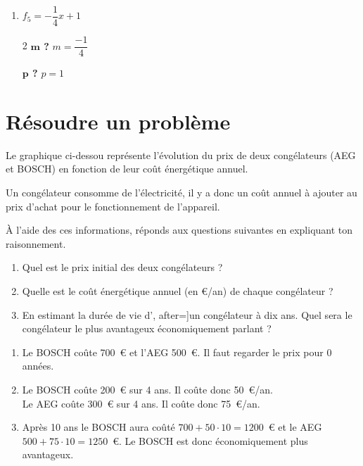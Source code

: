 \documentclass[a4paper, 12pt, parskip=half-]{scrartcl}
\begin{document}
\begin{solution}
\begin{enumerate}
\begin{multicols}{2}
                  \textbf{$\bm{p}$ ?}
                  \medbreak
                  $f_4$ est linéaire $\Rightarrow p=0$
              \end{multicols}
        \item $f_5 = -\dfrac{1}{4}x + 1 $
              \begin{multicols}{2}
                  \textbf{$\bm{m}$ ?}
                  \medbreak
                  $m=\dfrac{-1}{4}$
                  \columnbreak

                  \textbf{$\bm{p}$ ?}
                  \medbreak
                  $p=1$
              \end{multicols}
    \end{enumerate}
    \newpage
\end{solution}
\newpage
\section*{ Résoudre un problème}
\begin{exercise}[points=4]
    Le graphique ci-dessou représente l'évolution du prix de deux congélateurs (AEG et BOSCH) en fonction de leur coût énergétique annuel. 
    
    Un congélateur consomme de l'électricité, il y a donc un coût annuel à ajouter au prix d'achat pour le fonctionnement de l'appareil.
    
    À l'aide des ces informations, réponds aux questions suivantes en expliquant ton raisonnement.
    \begin{enumerate}[itemsep=1em]
        \item Quel est le prix initial des deux congélateurs ?
        \item Quelle est le coût énergétique annuel (en €/an) de chaque congélateur ?
        \item En estimant la durée de vie d', after=\vspace*{1em}]un congélateur à dix ans. Quel sera le congélateur le plus avantageux économiquement parlant ?
    \end{enumerate}
    \begin{center}
        
    \end{center}
\end{exercise}
\begin{solution}
    \begin{enumerate}
        \item Le BOSCH coûte 700~€ et l'AEG 500~€. Il faut regarder le prix pour 0 années.
        \item Le BOSCH coûte 200~€ sur 4 ans. Il coûte donc 50~€/an.\\
        Le AEG coûte 300~€ sur 4 ans. Il coûte donc 75~€/an.
        \item Après 10 ans le BOSCH aura coûté $700 + 50\cdot 10 = 1200$~€ et le AEG $500 + 75\cdot 10 = 1250$~€. Le BOSCH est donc économiquement plus avantageux.
    \end{enumerate}
\end{solution}
\end{document}
